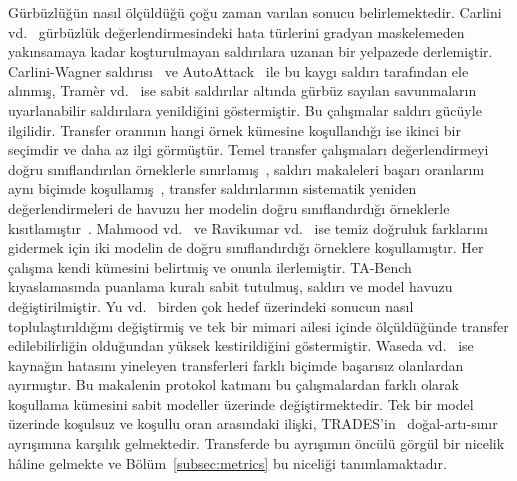 Gürbüzlüğün nasıl ölçüldüğü çoğu zaman varılan sonucu belirlemektedir. Carlini vd.~\cite{carlini2019evaluating} gürbüzlük değerlendirmesindeki hata türlerini gradyan maskelemeden yakınsamaya kadar koşturulmayan saldırılara uzanan bir yelpazede derlemiştir. Carlini-Wagner saldırısı~\cite{carlini2017towards} ve AutoAttack~\cite{croce2020reliable} ile bu kaygı saldırı tarafından ele alınmış, Tram\`er vd.~\cite{tramer2020adaptive} ise sabit saldırılar altında gürbüz sayılan savunmaların uyarlanabilir saldırılara yenildiğini göstermiştir. Bu çalışmalar saldırı gücüyle ilgilidir. Transfer oranının hangi örnek kümesine koşullandığı ise ikinci bir seçimdir ve daha az ilgi görmüştür. Temel transfer çalışmaları değerlendirmeyi doğru sınıflandırılan örneklerle sınırlamış~\cite{liu2017delving}, saldırı makaleleri başarı oranlarını aynı biçimde koşullamış~\cite{dong2018boosting}, transfer saldırılarının sistematik yeniden değerlendirmeleri de havuzu her modelin doğru sınıflandırdığı örneklerle kısıtlamıştır~\cite{zhao2025revisiting}. Mahmood vd.~\cite{mahmood2021robustness} ve Ravikumar vd.~\cite{ravikumar2023trend} ise temiz doğruluk farklarını gidermek için iki modelin de doğru sınıflandırdığı örneklere koşullamıştır. Her çalışma kendi kümesini belirtmiş ve onunla ilerlemiştir. TA-Bench~\cite{li2023tabench} kıyaslamasında puanlama kuralı sabit tutulmuş, saldırı ve model havuzu değiştirilmiştir. Yu vd.~\cite{yu2025reliable} birden çok hedef üzerindeki sonucun nasıl toplulaştırıldığını değiştirmiş ve tek bir mimari ailesi içinde ölçüldüğünde transfer edilebilirliğin olduğundan yüksek kestirildiğini göstermiştir. Waseda vd.~\cite{waseda2023closer} ise kaynağın hatasını yineleyen transferleri farklı biçimde başarısız olanlardan ayırmıştır. Bu makalenin protokol katmanı bu çalışmalardan farklı olarak koşullama kümesini sabit modeller üzerinde değiştirmektedir. Tek bir model üzerinde koşulsuz ve koşullu oran arasındaki ilişki, TRADES'in~\cite{zhang2019theoretically} doğal-artı-sınır ayrışımına karşılık gelmektedir. Transferde bu ayrışımın öncülü görgül bir nicelik hâline gelmekte ve Bölüm~\ref{subsec:metrics} bu niceliği tanımlamaktadır.
